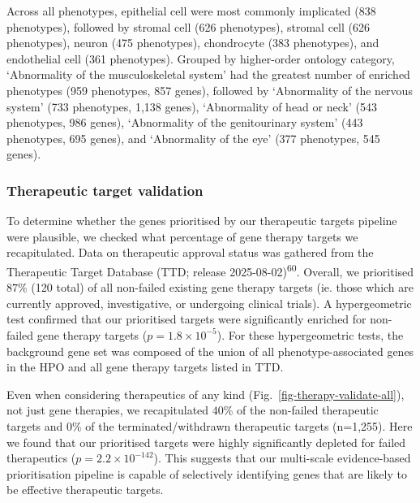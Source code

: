 \documentclass[
]{article}
\begin{document}
Across all phenotypes, epithelial cell were most commonly implicated
(838 phenotypes), followed by stromal cell (626 phenotypes), stromal
cell (626 phenotypes), neuron (475 phenotypes), chondrocyte (383
phenotypes), and endothelial cell (361 phenotypes). Grouped by
higher-order ontology category, `Abnormality of the musculoskeletal
system' had the greatest number of enriched phenotypes (959 phenotypes,
857 genes), followed by `Abnormality of the nervous system' (733
phenotypes, 1,138 genes), `Abnormality of head or neck' (543 phenotypes,
986 genes), `Abnormality of the genitourinary system' (443 phenotypes,
695 genes), and `Abnormality of the eye' (377 phenotypes, 545 genes).

\subsubsection{Therapeutic target
validation}\label{therapeutic-target-validation}

To determine whether the genes prioritised by our therapeutic targets
pipeline were plausible, we checked what percentage of gene therapy
targets we recapitulated. Data on therapeutic approval status was
gathered from the Therapeutic Target Database (TTD; release
2025-08-02)\textsuperscript{60}. Overall, we prioritised \(87\)\% (120
total) of all non-failed existing gene therapy targets (ie. those which
are currently approved, investigative, or undergoing clinical trials). A
hypergeometric test confirmed that our prioritised targets were
significantly enriched for non-failed gene therapy targets
(\(p=\)\(1.8 \times 10^{-5}\)). For these hypergeometric tests, the
background gene set was composed of the union of all
phenotype-associated genes in the HPO and all gene therapy targets
listed in TTD.

Even when considering therapeutics of any kind
(Fig.~\ref{fig-therapy-validate-all}), not just gene therapies, we
recapitulated \(40\)\% of the non-failed therapeutic targets and 0\% of
the terminated/withdrawn therapeutic targets (n=1,255). Here we found
that our prioritised targets were highly significantly depleted for
failed therapeutics (\(p=\)\(2.2 \times 10^{-142}\)). This suggests that
our multi-scale evidence-based prioritisation pipeline is capable of
selectively identifying genes that are likely to be effective
therapeutic targets.
\end{document}
